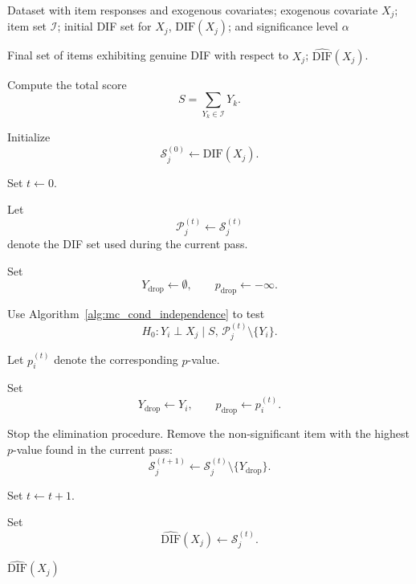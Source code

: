\begin{breakablealgorithm}
\caption{Elimination of Spurious DIF Items for One Exogenous Covariate $X_j$}
\label{alg:step3c}

\begin{algorithmic}[1]
\Require Dataset with item responses and exogenous covariates; exogenous covariate $X_j$; item set $\mathcal{I}$; initial DIF set for $X_j$, $\mathrm{DIF}(X_j)$; and significance level $\alpha$

\Ensure Final set of items exhibiting genuine DIF with respect to $X_j$; $\widehat{\mathrm{DIF}}(X_j)$.

\State Compute the total score
\[
S = \sum_{Y_k \in \mathcal{I}} Y_k .
\]

\State Initialize
\[
\mathcal{S}_j^{(0)} \gets \mathrm{DIF}(X_j).
\]

\State Set $t \gets 0$.

\Repeat

    \State Let
    \[
    \mathcal{P}_j^{(t)} \gets \mathcal{S}_j^{(t)}
    \]
    denote the DIF set used during the current pass.

    \State Set
    \[
    Y_{\mathrm{drop}} \gets \emptyset,
    \qquad
    p_{\mathrm{drop}} \gets -\infty .
    \]


        \State Use Algorithm~\ref{alg:mc_cond_independence} to test
        \[
        H_0:
        Y_i \perp X_j
        \mid
        S,\,
        \mathcal{P}_j^{(t)} \setminus \{Y_i\}.
        \]

        \State Let $p_i^{(t)}$ denote the corresponding $p$-value.

            \State Set
            \[
            Y_{\mathrm{drop}} \gets Y_i,
            \qquad
            p_{\mathrm{drop}} \gets p_i^{(t)} .
            \]
        \EndIf

    \EndFor

        \State Stop the elimination procedure.
    \Else
        \State Remove the non-significant item with the highest $p$-value found in the current pass:
        \[
        \mathcal{S}_j^{(t+1)}
        \gets
        \mathcal{S}_j^{(t)}
        \setminus
        \{Y_{\mathrm{drop}}\}.
        \]

        \State Set $t \gets t+1$.
    \EndIf


\State Set
\[
\widehat{\mathrm{DIF}}(X_j)
\gets
\mathcal{S}_j^{(t)} .
\]

\State \Return $\widehat{\mathrm{DIF}}(X_j)$

\end{algorithmic}
\end{breakablealgorithm}